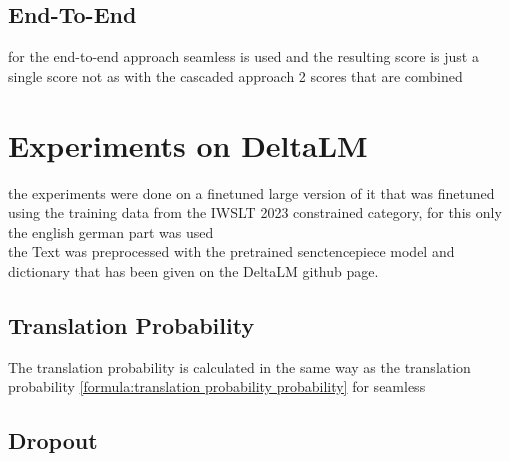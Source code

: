 \section{End-To-End}
for the end-to-end approach seamless is used and the resulting score is just a single score not as with the cascaded approach 2 scores that are combined 

\chapter{Experiments on DeltaLM}
the experiments \cite{ma2021deltalm} were done on a finetuned large version of it that was finetuned using the training data from the IWSLT 2023 constrained category, for this only the english german part was used
\\
the Text was preprocessed with the pretrained senctencepiece model and dictionary that has been given on the DeltaLM github page. 




\section{Translation Probability}
The translation probability is calculated in the same way as the translation probability \ref{formula:translation probability probability} for seamless 
\section{Dropout}
